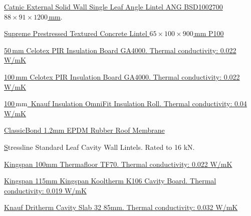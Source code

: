 \documentclass{extension}
\newcommand{\mm}{\,$\mathrm{mm}$}
\begin{document}
\begin{thebibliography}{9}
 \href{https://www.travisperkins.co.uk/steel-lintels/catnic-external-solid-wall-single-leaf-angle-lintel-1200mm-ang1200/p/270812}{Catnic External Solid Wall Single Leaf Angle Lintel ANG BSD1002700 $88\times91\times1200$\,mm}.

 \href{https://www.travisperkins.co.uk/concrete-lintels/supreme-prestressed-textured-concrete-lintel-65mm-x-100mm-x-900mm-p100/p/700507}{Supreme Prestressed Textured Concrete Lintel $65\times100\times900$\,mm P100}

 \href{https://www.travisperkins.co.uk/insulation-board/50mm-x-2400mm-x-1200mm-celotex-pir-insulation-board-ga4000/p/778040}{50\,mm Celotex PIR Insulation Board GA4000. Thermal conductivity: 0.022 W/mK}

 \href{https://www.travisperkins.co.uk/insulation-board/100mm-x-2400mm-x-1200mm-celotex-pir-insulation-board-ga4000/p/778048}{100\,mm Celotex PIR Insulation Board GA4000. Thermal conductivity: 0.022 W/mK}

 \href{https://www.travisperkins.co.uk/loft-insulation/knauf-insulation-omnifit-insulation-roll-6860mm-x-1200mm-x-100mm/p/734020}{100\mm\ Knauf Insulation OmniFit Insulation Roll. Thermal conductivity: 0.04 W/mK}

 \href{https://www.rubber4roofs.co.uk/classicbond-one-piece-epdm-rubber-roof-covering-1-20mm}{ClassicBond 1.2mm EPDM Rubber Roof Membrane}

 \href{https://www.stressline.net/wp-content/uploads/2022/04/Stressline_Lintel_Guide_Feb2022_download.pdf} Stressline Standard Leaf Cavity Wall Lintels. Rated to 16 kN.

 \href{https://www.kingspan.com/gb/en/products/insulation-boards/floor-insulation-boards/thermafloor-tf70/}{Kingspan 100mm Thermafloor TF70. Thermal conductivity: 0.022 W/mK}

 \href{https://www.jewson.co.uk/p/kingspan-kooltherm-k106-cavity-board-1200-x-450-x-115mm-pack-of-4-IK106115} {Kingspan 115mm Kingspan Kooltherm K106 Cavity Board. Thermal conductivity: 0.019 W/mK}

 \href{https://www.travisperkins.co.uk/cavity-and-internal-wall-insulation/knauf-dritherm-cavity-slab-32-85mm-455-x-1200mm-2-73m2-per-pack/p/848626?gclid=Cj0KCQjw7aqkBhDPARIsAKGa0oIWRlMly_UsJOFDSrQJAOasgPovH9dFJJFFpmnhtPwcoliCuB8_0a4aAik4EALw_wcB&gclsrc=aw.ds} {Knauf Dritherm Cavity Slab 32 85mm. Thermal conductivity: 0.032 W/mK}


\end{thebibliography}
\end{document}
